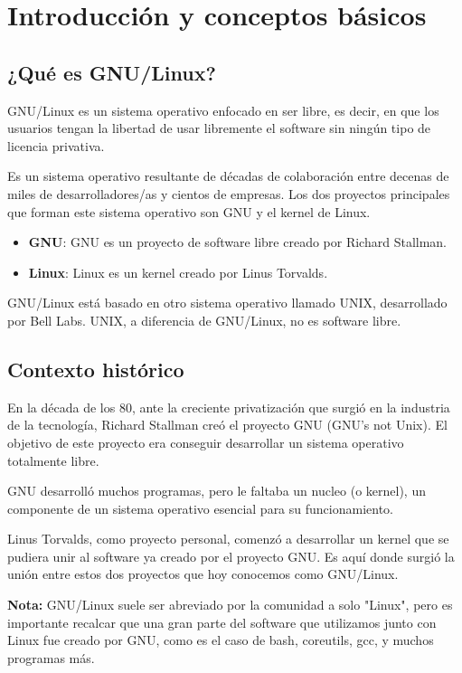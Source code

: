 \chapter{Introducción y conceptos básicos}
\section{¿Qué es GNU/Linux?}

GNU/Linux es un sistema operativo enfocado en ser libre, es decir, en que los usuarios tengan la libertad de usar libremente el software sin ningún tipo de licencia privativa.

Es un sistema operativo resultante de décadas de colaboración entre decenas de miles de desarrolladores/as y cientos de empresas. Los dos proyectos principales que forman este sistema operativo son GNU y el kernel de Linux.

\begin{itemize}
\item \textbf{GNU}: GNU es un proyecto de software libre creado por Richard Stallman.
\item \textbf{Linux}: Linux es un kernel creado por Linus Torvalds.
\end{itemize} 

GNU/Linux está basado en otro sistema operativo llamado UNIX, desarrollado por Bell Labs. UNIX, a diferencia de GNU/Linux, no es software libre.

\section{Contexto histórico}
En la década de los 80, ante la creciente privatización que surgió en la industria de la tecnología, Richard Stallman creó el proyecto GNU (GNU's not Unix). El objetivo de este proyecto era conseguir desarrollar un sistema operativo totalmente libre.

GNU desarrolló muchos programas, pero le faltaba un nucleo (o kernel), un componente de un sistema operativo esencial para su funcionamiento.

Linus Torvalds, como proyecto personal, comenzó a desarrollar un kernel que se pudiera unir al software ya creado por el proyecto GNU. Es aquí donde surgió la unión entre estos dos proyectos que hoy conocemos como GNU/Linux.

\textbf{Nota:} GNU/Linux suele ser abreviado por la comunidad a solo "Linux", pero es importante recalcar que una gran parte del software que utilizamos junto con Linux fue creado por GNU, como es el caso de bash, coreutils, gcc, y muchos programas más.

